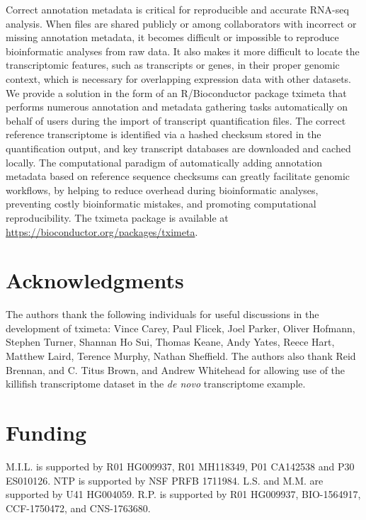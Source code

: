 \documentclass[10pt,letterpaper]{article}
\begin{document}
Correct annotation metadata is critical for reproducible and accurate
RNA-seq analysis. When files are shared publicly or among
collaborators with incorrect or missing annotation metadata, it
becomes difficult or impossible to reproduce bioinformatic analyses
from raw data. It also makes it more difficult to locate the
transcriptomic features, such as transcripts or genes, in their proper
genomic context, which is necessary for overlapping expression data
with other datasets. We provide a solution in the form of an
R/Bioconductor package tximeta that performs numerous annotation and
metadata gathering tasks automatically on behalf of users during the
import of transcript quantification files. The correct reference
transcriptome is identified via a hashed checksum stored in the
quantification output, and key transcript databases are downloaded and
cached locally. The computational paradigm of automatically adding
annotation metadata based on reference sequence checksums can greatly
facilitate genomic workflows, by helping to reduce overhead during
bioinformatic analyses, preventing costly bioinformatic mistakes, and
promoting computational reproducibility.
The tximeta package is
available at \url{https://bioconductor.org/packages/tximeta}.

\linenumbers



\section*{Acknowledgments}

The authors thank the following individuals for useful discussions 
in the development of tximeta: Vince Carey, Paul Flicek, Joel Parker,
Oliver Hofmann, Stephen Turner, Shannan Ho Sui, Thomas Keane, Andy
Yates, Reece Hart, Matthew Laird, Terence Murphy, Nathan Sheffield.
The authors also thank Reid Brennan, and C. Titus Brown, and Andrew
Whitehead for allowing use of the killifish transcriptome dataset in
the \textit{de novo} transcriptome example.

\section*{Funding}

M.I.L. is supported by R01 HG009937, R01 MH118349, P01 CA142538 and
P30 ES010126.
NTP is supported by NSF PRFB 1711984.
L.S. and M.M. are supported by U41 HG004059.
R.P. is supported by R01 HG009937, BIO-1564917, CCF-1750472, and
CNS-1763680. 

\nolinenumbers


\end{document}
